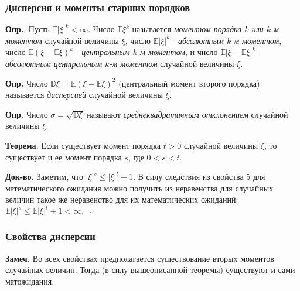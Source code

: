 \documentclass[oneside,final,14pt]{extreport}
\newcommand\mydef{{\bf Опр.}}
\newcommand\mynote{{\bf Замеч.}}
\newcommand\myth{{\bf Теорема.}}
\newcommand\myqed{{\bf Док-во.}}
\theoremstyle{definition}
\begin{document}
\subsubsection{Дисперсия и моменты старших порядков}

\mydef{}. Пусть $\mathbb{E}|\xi|^k < \infty.$ Число $\mathbb{E}\xi^k$ называется {\it моментом порядка $k$ или $k$-м моментом} случайной величины $\xi$, число $\mathbb{E}|\xi|^k$ - {\it абсолютным $k$-м моментом}, число $\mathbb{E}(\xi - \mathbb{E}\xi)^k$ - {\it центральным $k$-м моментом}, и число $\mathbb{E}|\xi - \mathbb{E}\xi|^k$ - {\it абсолютным центральным $k$-м моментом} случайной величины $\xi$. 

\mydef{} Число $\mathbb{D}\xi = \mathbb{E}(\xi - \mathbb{E}\xi)^2$ (центральный момент второго порядка) называется {\it дисперсией} случайной величины $\xi$.

\mydef{} Число $\sigma = \sqrt{\mathbb{D}\xi}$ называют {\it среднеквадратичным отклонением} случайной величины $\xi$.

\myth{} Если существует момент порядка $t > 0$ случайной величины $\xi$, то существует и ее момент порядка $s$, где $0 < s < t$.

\myqed{} Заметим, что $|\xi|^s \leqslant |\xi|^t + 1.$ В силу следствия из свойства 5 для математического ожидания можно получить из неравенства для случайных величин такое же неравенство для их математических ожиданий: $\mathbb{E}|\xi|^s \leqslant \mathbb{E}|\xi|^t + 1 < \infty. ~~~ \square$



\subsubsection{Свойства дисперсии}

\mynote{} Во всех свойствах предполагается существование вторых моментов случайных величин. Тогда (в силу вышеописанной теоремы) существуют и сами матожидания.
\end{document}
